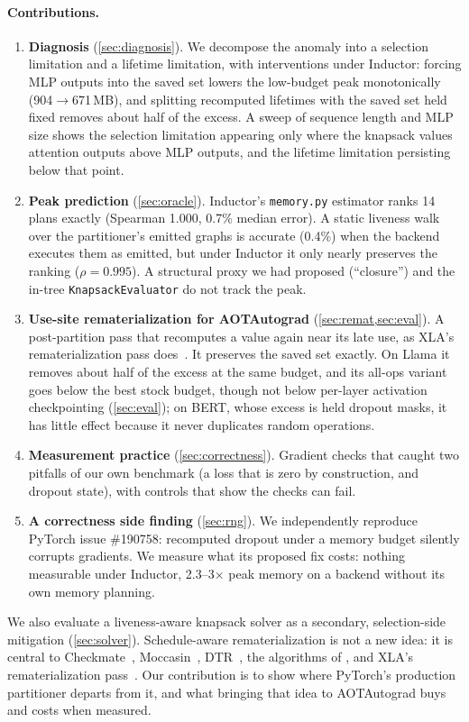 \documentclass[10pt]{article}
\newcommand{\code}[1]{\texttt{#1}}
\begin{document}
\paragraph{Contributions.}
\begin{enumerate}
\item \textbf{Diagnosis} (\cref{sec:diagnosis}). We decompose the anomaly into a selection limitation and a lifetime
limitation, with interventions under Inductor: forcing MLP outputs into the saved set lowers the low-budget peak
monotonically (904$\to$671\,MB), and splitting recomputed lifetimes with the saved set held fixed removes about half of
the excess. A sweep of sequence length and MLP size shows the selection limitation appearing only where the knapsack
values attention outputs above MLP outputs, and the lifetime limitation persisting below that point.
\item \textbf{Peak prediction} (\cref{sec:oracle}). Inductor's \code{memory.py} estimator ranks 14 plans exactly
(Spearman 1.000, 0.7\% median error). A static liveness walk over the partitioner's emitted graphs is accurate (0.4\%)
when the backend executes them as emitted, but under Inductor it only nearly preserves the ranking ($\rho=0.995$). A structural proxy we had proposed
(``closure'') and the in-tree \code{KnapsackEvaluator} do not track the peak.
\item \textbf{Use-site rematerialization for AOTAutograd} (\cref{sec:remat,sec:eval}). A post-partition pass that
recomputes a value again near its late use, as XLA's rematerialization pass does~\citep{xlaremat}. It preserves the
saved set exactly. On Llama it removes about half of the excess at the same budget, and its all-ops variant goes below
the best stock budget, though not below per-layer activation checkpointing (\cref{sec:eval}); on BERT, whose excess is held dropout masks, it has little effect because it never duplicates
random operations.
\item \textbf{Measurement practice} (\cref{sec:correctness}). Gradient checks that caught two pitfalls of our own
benchmark (a loss that is zero by construction, and dropout state), with controls that show the checks can fail.
\item \textbf{A correctness side finding} (\cref{sec:rng}). We independently reproduce PyTorch issue \#190758:
recomputed dropout under a memory budget silently corrupts gradients. We measure what its proposed fix costs: nothing
measurable under Inductor, 2.3--3$\times$ peak memory on a backend without its own memory planning.
\end{enumerate}
We also evaluate a liveness-aware knapsack solver as a secondary, selection-side mitigation (\cref{sec:solver}).
Schedule-aware rematerialization is not a new idea: it is central to Checkmate~\citep{jain2020checkmate},
Moccasin~\citep{bartan2023moccasin}, DTR~\citep{kirisame2021dtr}, the algorithms of \citet{kumar2019efficient}, and XLA's
rematerialization pass~\citep{xlaremat}. Our contribution is to show where PyTorch's production partitioner departs from
it, and what bringing that idea to AOTAutograd buys and costs when measured.
\end{document}
